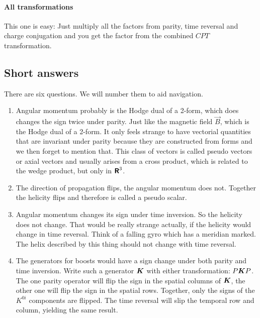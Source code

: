 \documentclass[11pt, english, fleqn, DIV=15, headinclude, BCOR=1cm]{scrartcl}
\begin{document}
\paragraph{All transformations}

This one is easy: Just multiply all the factors from parity, time reversal and
charge conjugation and you get the factor from the combined $CPT$
transformation.

\subsection{Short answers}

There are six questions. We will number them to aid navigation.

\begin{enumerate}
    \item
        Angular momentum probably is the Hodge dual of a 2-form, which does
        changes the sign twice under parity. Just like the magnetic field $\vec
        B$, which is the Hodge dual of a 2-form. It only feels strange to have
        vectorial quantities that are invariant under parity because they are
        constructed from forms and we then forget to mention that. This class
        of vectors is called pseudo vectors or axial vectors and usually arises
        from a cross product, which is related to the wedge product, but only
        in $\text{\bfseries\sffamily R}^3$.

    \item
        The direction of propagation flips, the angular momentum does not.
        Together the helicity flips and therefore is called a pseudo scalar.

    \item
        Angular momentum changes its sign under time inversion. So the helicity
        does not change. That would be really strange actually, if the helicity
        would change in time reversal. Think of a falling gyro which has a
        meridian marked. The helix described by this thing should not change
        with time reversal.

    \item
        The generators for boosts would have a sign change under both parity
        and time inversion. Write such a generator $\mat K$ with either
        transformation: $P \mat K P$. The one parity operator will flip the
        sign in the spatial columns of $\mat K$, the other one will flip the
        sign in the spatial rows. Together, only the signs of the $K^{0i}$
        components are flipped. The time reversal will slip the temporal row
        and column, yielding the same result.


\end{enumerate}
\end{document}
